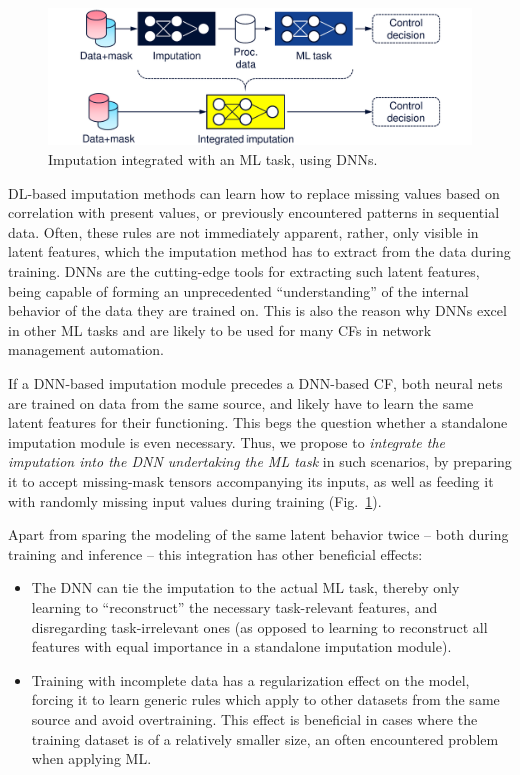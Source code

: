 				\begin{figure}[ht]
					\centering
					\includegraphics[width=0.8\linewidth]{figures/12_imputation/integrated_imp/integrated_imp.pdf}
					\caption[Integrated imputation]{Imputation integrated with an ML task, using DNNs.}
					\label{fig:integrated_imp}
				\end{figure}	
				
				\ac{DL}-based imputation methods can learn how to replace missing values based on correlation with present values, or previously encountered patterns in sequential data.
				Often, these rules are not immediately apparent, rather, only visible in latent features, which the imputation method has to extract from the data during training.
				\acp{DNN} are the cutting-edge tools for extracting such latent features, being capable of forming an unprecedented ``understanding'' of the internal behavior of the data they are trained on.
				This is also the reason why \acp{DNN} excel in other \ac{ML} tasks and are likely to be used for many \acp{CF} in network management automation.
				
				If a \ac{DNN}-based imputation module precedes a \ac{DNN}-based \ac{CF}, both neural nets are trained on data from the same source, and likely have to learn the same latent features for their functioning.
				This begs the question whether a standalone imputation module is even necessary.
				Thus, we propose to \textit{integrate the imputation into the \ac{DNN} undertaking the \ac{ML} task} in such scenarios, by preparing it to accept missing-mask tensors accompanying its inputs, as well as feeding it with randomly missing input values during training (Fig.~\ref{fig:integrated_imp}).
				
				Apart from sparing the modeling of the same latent behavior twice -- both during training and inference -- this integration has other beneficial effects:
				\begin{itemize}
					\item 
					The \ac{DNN} can tie the imputation to the actual \ac{ML} task, thereby only learning to ``reconstruct'' the necessary task-relevant features, and disregarding task-irrelevant ones (as opposed to learning to reconstruct all features with equal importance in a standalone imputation module).
					
					\item
					Training with incomplete data has a regularization effect on the model, forcing it to learn generic rules which apply to other datasets from the same source and avoid overtraining.
					This effect is beneficial in cases where the training dataset is of a relatively smaller size, an often encountered problem when applying \ac{ML}.
				\end{itemize}

